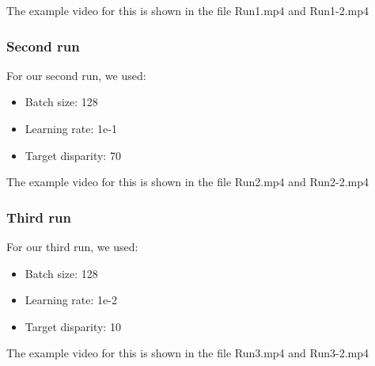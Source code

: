 \documentclass[conference]{IEEEtran}
\begin{document}
The example video for this is shown in the file Run1.mp4 and Run1-2.mp4

\subsubsection{Second run}
For our second run, we used:
\begin{itemize}
  \item Batch size: 128
  \item Learning rate: 1e-1
  \item Target disparity: 70
\end{itemize}

The example video for this is shown in the file Run2.mp4 and Run2-2.mp4

\subsubsection{Third run}
For our third run, we used:
\begin{itemize}
  \item Batch size: 128
  \item Learning rate: 1e-2
  \item Target disparity: 10
\end{itemize}

The example video for this is shown in the file Run3.mp4 and Run3-2.mp4




\end{document}
